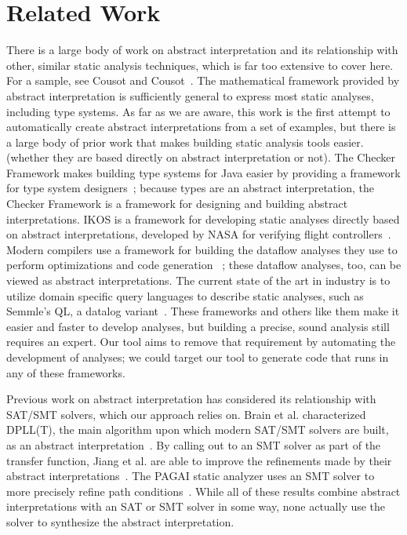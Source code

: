 \documentclass[10pt,conference]{IEEEtran}
\begin{document}
\section{Related Work}

There is a large body of work on abstract interpretation and its relationship
with other, similar static analysis techniques, which is far
too extensive to cover here.
For a sample, see Cousot and Cousot~\cite{cousot14}.
The mathematical framework provided by abstract interpretation is sufficiently
general to express most static analyses, including type systems.
As far as we are aware, this work is the first attempt to automatically
create abstract interpretations from a set of examples, but there is a
large body of prior work that makes building static analysis tools easier.
(whether they are based directly on abstract interpretation or not).
The Checker Framework makes building type systems for Java easier
by providing a framework for type system designers~\cite{checker-framework};
because types are an abstract interpretation, the Checker Framework
is a framework for designing and building abstract interpretations.
IKOS is a framework for developing static analyses directly based on
abstract interpretations, developed by NASA for verifying flight
controllers~\cite{ikos}. Modern compilers use a framework for building
the dataflow analyses they use to perform optimizations and code generation
~\cite{lattner04:_llvm}; these dataflow analyses, too, can be viewed as
abstract interpretations. The current state of the art in industry is to
utilize domain specific query languages to describe static analyses, such as 
Semmle's QL, a datalog variant~\cite{semmle-ql-primer}.
These frameworks and others like them make it easier and faster to develop analyses, but 
building a precise, sound analysis still requires an expert.  Our tool 
aims to remove that requirement by automating the development of analyses; 
we could target our tool to generate code that runs in any of these frameworks.

Previous work on abstract interpretation has considered its relationship
with SAT/SMT solvers, which our approach relies on. Brain et al. characterized
DPLL(T), the main algorithm upon which modern SAT/SMT solvers are built,
as an abstract interpretation~\cite{brain2013abstract}. By calling out to
an SMT solver as part of the transfer function, Jiang et al. are able to
improve the refinements made by their abstract
interpretations~\cite{jiang2017block}. The PAGAI static analyzer uses
an SMT solver to more precisely refine path conditions~\cite{pagai}.
While all of these results combine abstract interpretations with
an SAT or SMT solver in some way, none actually use the solver to
synthesize the abstract interpretation.
\end{document}
